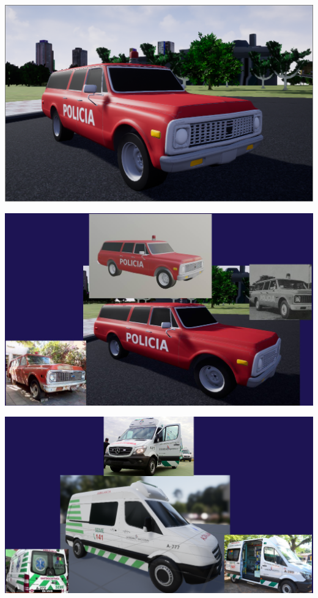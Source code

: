 \documentclass{article}
\begin{document}
  \includegraphics[width=\textwidth]{65.png}
  
  \includegraphics[width=\textwidth]{71.jpg}
  
  \includegraphics[width=\textwidth]{68.png}
  
\end{document}
